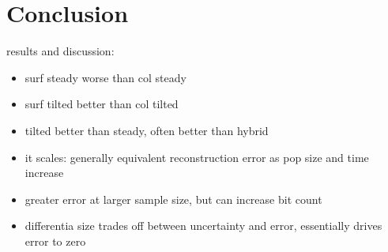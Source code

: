 \section{Conclusion} \label{sec:conclusion}

results and discussion:
\begin{itemize}
    \item surf steady worse than col steady
    \item surf tilted better than col tilted
    \item tilted better than steady, often better than hybrid
    \item it scales: generally equivalent reconstruction error as pop size and time increase
    \item greater error at larger sample size, but can increase bit count
    \item differentia size trades off between uncertainty and error, essentially drives error to zero
\end{itemize}
